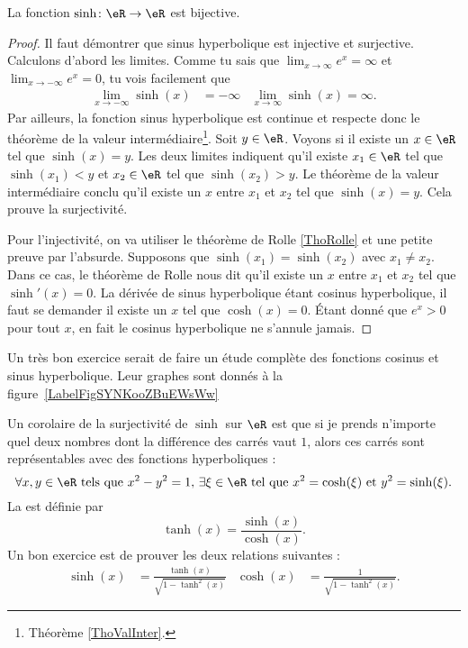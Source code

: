 \begin{proposition}
	La fonction \( \sinh\colon \eR\to\eR \) est bijective.
\end{proposition}

\begin{proof}
	Il faut démontrer que sinus hyperbolique est injective et surjective. Calculons d'abord les limites. Comme tu sais que \( \lim_{x\to\infty} e^{x}=\infty\) et \( \lim_{x\to-\infty} e^{x}=0\), tu vois facilement que
	\begin{align}
		\lim_{x\to-\infty}\sinh(x) & =-\infty & \lim_{x\to\infty}\sinh(x)=\infty.
	\end{align}
	Par ailleurs, la fonction sinus hyperbolique est continue et respecte donc le théorème de la valeur intermédiaire\footnote{Théorème \ref{ThoValInter}.}. Soit \( y\in\eR\). Voyons si il existe un \( x\in\eR\) tel que \( \sinh(x)=y\). Les deux limites indiquent qu'il existe \( x_1\in\eR\) tel que \( \sinh(x_1)<y\) et \( x_2\in\eR\) tel que \( \sinh(x_2)>y\). Le théorème de la valeur intermédiaire conclu qu'il existe un \( x\) entre \( x_1\) et \( x_2\) tel que \( \sinh(x)=y\). Cela prouve la surjectivité.

	Pour l'injectivité, on va utiliser le théorème de Rolle \ref{ThoRolle} et une petite preuve par l'absurde. Supposons que \( \sinh(x_1)=\sinh(x_2)\) avec \( x_1\neq x_2\). Dans ce cas, le théorème de Rolle nous dit qu'il existe un \( x\) entre \( x_1\) et \( x_2\) tel que \( \sinh'(x)=0\). La dérivée de sinus hyperbolique étant cosinus hyperbolique, il faut se demander il existe un \( x\) tel que \( \cosh(x)=0\). Étant donné que \(  e^{x}>0\) pour tout \( x\), en fait le cosinus hyperbolique ne s'annule jamais.
\end{proof}

\newcommand{\CaptionFigSYNKooZBuEWsWw}{En rouge, la fonction \( x\mapsto \sinh(x)\) et en bleu, la fonction \( x\mapsto\cosh(x)\).}


Un très bon exercice serait de faire un étude complète des fonctions cosinus et sinus hyperbolique. Leur graphes sont donnés à la figure~\ref{LabelFigSYNKooZBuEWsWw}

Un corolaire de la surjectivité de \( \sinh\) sur \( \eR\) est que si je prends n'importe quel deux nombres dont la différence des carrés vaut \( 1\), alors ces carrés sont représentables avec des fonctions hyperboliques :
\[
	\forall x,y\in\eR \text{ tels que } x^2-y^2=1,\,\exists\xi\in\eR \text{ tel que } x^2=\cosh(\xi)\text{ et }y^2=\sinh(\xi).
\]
La  est définie par
\begin{equation}
	\tanh(x)=\frac{ \sinh(x) }{ \cosh(x) }.
\end{equation}
Un bon exercice est de prouver les deux relations suivantes :
\begin{align}		\label{EqRelSinhthcosh}
	\sinh(x) & =\frac{ \tanh(x) }{ \sqrt{1-\tanh^2(x)} } & \cosh(x) & =\frac{1}{ \sqrt{1-\tanh^2(x)} }.
\end{align}

